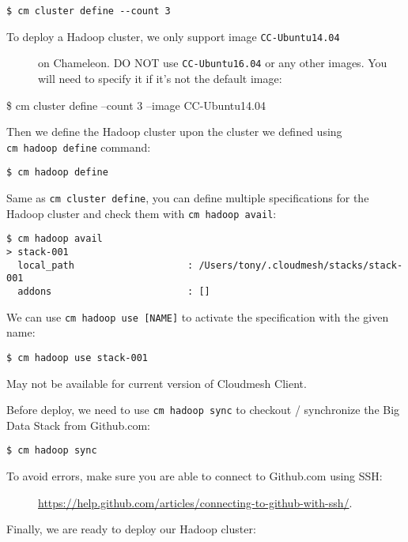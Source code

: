 \begin{verbatim}
$ cm cluster define --count 3
\end{verbatim}

\begin{description}
\item[To deploy a Hadoop cluster, we only support image
\texttt{CC-Ubuntu14.04}]
on Chameleon. DO NOT use \texttt{CC-Ubuntu16.04} or any other images.
You will need to specify it if it's not the default image:
\end{description}

\$ cm cluster define --count 3 --image CC-Ubuntu14.04

Then we define the Hadoop cluster upon the cluster we defined using
\texttt{cm\ hadoop\ define} command:

\begin{verbatim}
$ cm hadoop define
\end{verbatim}

Same as \texttt{cm\ cluster\ define}, you can define multiple
specifications for the Hadoop cluster and check them with
\texttt{cm\ hadoop\ avail}:

\begin{verbatim}
$ cm hadoop avail
> stack-001
  local_path                    : /Users/tony/.cloudmesh/stacks/stack-001
  addons                        : []
\end{verbatim}

We can use \texttt{cm\ hadoop\ use\ {[}NAME{]}} to activate the
specification with the given name:

\begin{verbatim}
$ cm hadoop use stack-001
\end{verbatim}

May not be available for current version of Cloudmesh Client.

Before deploy, we need to use \texttt{cm\ hadoop\ sync} to checkout /
synchronize the Big Data Stack from Github.com:

\begin{verbatim}
$ cm hadoop sync
\end{verbatim}

\begin{description}
\item[To avoid errors, make sure you are able to connect to Github.com
using SSH:]
\url{https://help.github.com/articles/connecting-to-github-with-ssh/}.
\end{description}

Finally, we are ready to deploy our Hadoop cluster:

